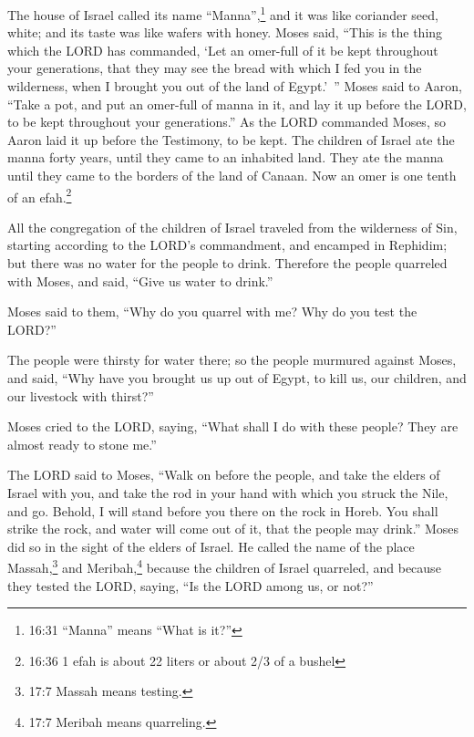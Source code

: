 \myverse{}The house of Israel called its name “Manna”,\footnote{16:31 “Manna” means “What is it?”} and it was like coriander seed, white; and its taste was
like wafers with honey.
\myverse{}Moses said, “This is the thing which the LORD has commanded, ‘Let an omer-full
of it be kept throughout your generations, that they may see the bread with which I fed you in the wilderness,
when I brought you out of the land of Egypt.’ ”
\myverse{}Moses said to Aaron, “Take a pot, and put an omer-full of manna in it, and
lay it up before the LORD, to be kept throughout your generations.”
\myverse{}As the LORD commanded Moses, so Aaron laid it up before the Testimony, to
be kept.
\myverse{}The children of Israel ate the manna forty years, until they came to an inhabited
land. They ate the manna until they came to the borders of the land of Canaan.
\myverse{}Now an omer is one tenth of an efah.\footnote{16:36 1 efah is about 22 liters or about 2/3 of a bushel}


\mychapter{} \myverse*{}All the congregation of the children of Israel traveled from the
wilderness of Sin, starting according to the LORD’s commandment, and encamped in Rephidim; but there was
no water for the people to drink.
\myverse{}Therefore the people quarreled with Moses, and said, “Give us water to drink.”

Moses said to them, “Why do you quarrel with me? Why do you test the LORD?”


\myverse{}The people were thirsty for water there; so the people murmured
against Moses, and said, “Why have you brought us up out of Egypt, to kill us, our children, and our livestock
with thirst?”


\myverse{}Moses cried to the LORD, saying, “What shall I do with these people?
They are almost ready to stone me.”


\myverse{}The LORD said to Moses, “Walk on before the people, and take the
elders of Israel with you, and take the rod in your hand with which you struck the Nile, and go.
\myverse{}Behold, I will stand before you there on the rock in Horeb. You shall strike
the rock, and water will come out of it, that the people may drink.” Moses did so in the sight of the
elders of Israel.
\myverse{}He called the name of the place Massah,\footnote{17:7 Massah means testing.} and Meribah,\footnote{17:7 Meribah means quarreling.} because the children of Israel quarreled, and because they
tested the LORD, saying, “Is the LORD among us, or not?”


